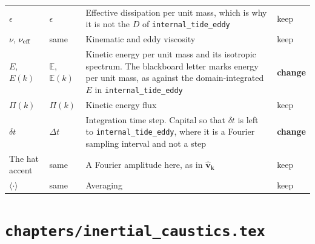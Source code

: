 \documentclass[11pt,a4paper]{article}
\newcommand{\mb}[1]{\mathbb{#1}}
\newcommand{\chg}{\textbf{change}}
\newcommand{\kp}{keep}
\begin{document}
\begin{longtable}{@{}p{3.1cm} p{3.1cm} p{8.6cm} p{1.6cm}@{}}
$\epsilon$ & $\epsilon$ & Effective dissipation per unit mass, which is why it is not the $D$ of \texttt{internal\_tide\_eddy} & \kp \\
$\nu$, $\nu_{\rm eff}$ & same & Kinematic and eddy viscosity & \kp \\
$E$, $E(k)$ & $\mb{E}$, $\mb{E}(k)$ & Kinetic energy per unit mass and its isotropic spectrum. The blackboard letter marks energy per unit mass, as against the domain-integrated $E$ in \texttt{internal\_tide\_eddy} & \chg \\
$\Pi(k)$ & $\Pi(k)$ & Kinetic energy flux & \kp \\
$\delta t$ & $\Delta t$ & Integration time step. Capital so that $\delta t$ is left to \texttt{internal\_tide\_eddy}, where it is a Fourier sampling interval and not a step & \chg \\
The hat accent & same & A Fourier amplitude here, as in $\hat{\mathbf{v}}_{\mathbf{k}}$ & \kp \\
$\langle\cdot\rangle$ & same & Averaging & \kp \\
\bottomrule
\end{longtable}

\section*{\texttt{chapters/inertial\_caustics.tex}}
\end{document}
